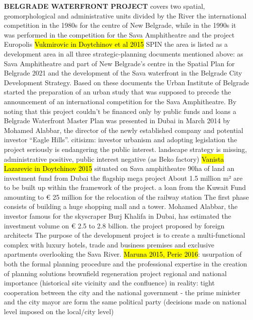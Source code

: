 \documentclass[11pt]{report}
\begin{document}
\textbf{BELGRADE WATERFRONT PROJECT}
covers two  spatial,  geomorphological  and  administrative units divided by the River
the  international  competition in the 1980s for the centre of New Belgrade, while in the 1990s  it  was  performed  in  the  competition  for  the 
Sava Amphitheatre and the project Europolis 
	\hl{Vukmirovic in Doytchinov et al 2015}
SPIN
the  area  is  listed  as  a development  area  in  all  three  strategic-planning documents mentioned above: as Sava Amphitheatre and part of New Belgrade’s centre in the Spatial Plan for Belgrade 2021 and the development of the Sava waterfront in the Belgrade City Development Strategy. 
Based  on  these  documents  the  Urban  Institute  of Belgrade  started  the  preparation  of  an  urban  study that was supposed to precede the announcement of an international competition for the Sava Amphitheatre. 
By  noting  that  this  project couldn’t be financed only by public funds and loans
a  Belgrade  Waterfront Master Plan was presented in Dubai in March 2014 
by  Mohamed  Alabbar,  the  director  of  the  newly established  company  and  potential  investor  “Eagle Hills”.
citisizm: investor urbanism and adopting legislation
the project seriously is endangering the public interest. 
landscape strategy is missing, administrative positive, public interest negative (as Beko factory)
	\hl{Vanista Lazarevic in Doytchinov 2015}
situated on Sava amphitheatre
90ha of land
an  investment  fund  from  Dubai  the  flagship mega project
About 1.5 million m² are to be built up within the framework of the project.
a loan from the Kuwait Fund amounting to € 25 million for the relocation of the railway station
The first phase consists of building a huge shopping mall and a tower. Mohamed Alabbar,  the  investor  famous  for  the  skyscraper Burj Khalifa in Dubai, has estimated the investment volume on € 2.5 to 2.8 billion. 
the project proposed by foreign architects
The purpose  of  the  development  project  is  to  create  a multi-functional  complex  with  luxury  hotels,  trade and  business  premises  and  exclusive  apartments overlooking  the  Sava  River. 
	\hl{Maruna 2015, Peric 2016}:
usurpation of both the formal planning procedure and the professional expertise in the creation of planning solutions
brownfield regeneration project
regional and national importance (historical site vicinity and the confluence)
in reality: tight cooperation between the city and the national government - the prime minister and the city mayor are form the same political party (decisions made on national level imposed on the local/city level)
\end{document}
